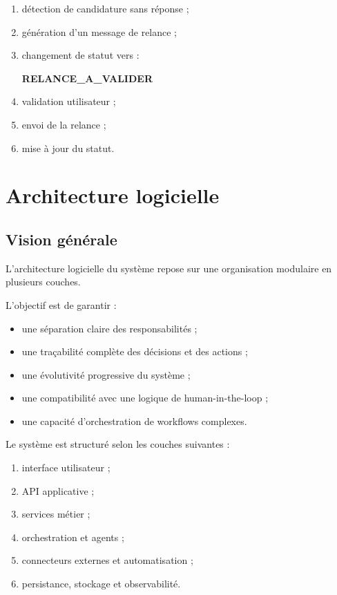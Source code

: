 \documentclass[11pt,a4paper]{article}
\begin{document}
\begin{enumerate}

\item détection de candidature sans réponse ;

\item génération d’un message de relance ;

\item changement de statut vers :

\begin{center}
\textbf{RELANCE\_A\_VALIDER}
\end{center}

\item validation utilisateur ;

\item envoi de la relance ;

\item mise à jour du statut.

\end{enumerate}
\section{Architecture logicielle}

\subsection{Vision générale}

L’architecture logicielle du système repose sur une organisation modulaire en plusieurs couches.

L’objectif est de garantir :

\begin{itemize}
    \item une séparation claire des responsabilités ;
    \item une traçabilité complète des décisions et des actions ;
    \item une évolutivité progressive du système ;
    \item une compatibilité avec une logique de human-in-the-loop ;
    \item une capacité d’orchestration de workflows complexes.
\end{itemize}

Le système est structuré selon les couches suivantes :

\begin{enumerate}
    \item interface utilisateur ;
    \item API applicative ;
    \item services métier ;
    \item orchestration et agents ;
    \item connecteurs externes et automatisation ;
    \item persistance, stockage et observabilité.
\end{enumerate}
\end{document}
